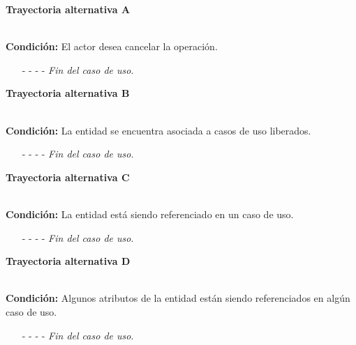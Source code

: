 \hypertarget{CU7-3:TAA}{\textbf{Trayectoria alternativa A}}\\
\noindent \textbf{Condición:} El actor desea cancelar la operación.
\begin{enumerate}
	\UCpaso[\UCactor] Oprime el botón  de la pantalla emergente.
	\UCpaso[\UCsist] Muestra la pantalla .
	\item[- -] - - {\em {Fin del caso de uso}}.%
\end{enumerate}		
\hypertarget{CU7-3:TAB}{\textbf{Trayectoria alternativa B}}\\
\noindent \textbf{Condición:} La entidad se encuentra asociada a casos de uso liberados.
\begin{enumerate}
	\UCpaso[\UCsist] Oculta el botón \eliminar de la entidad que esta asociada a casos de uso liberados.
	\item[- -] - - {\em {Fin del caso de uso}}.
\end{enumerate}
\hypertarget{CU7-3:TAC}{\textbf{Trayectoria alternativa C}}\\
\noindent \textbf{Condición:} La entidad está siendo referenciado en un caso de uso.
\begin{enumerate}
	\UCpaso[\UCsist] Muestra el mensaje  en la pantalla .
	\item[- -] - - {\em {Fin del caso de uso}}.
\end{enumerate}
\hypertarget{CU7-3:TAD}{\textbf{Trayectoria alternativa D}}\\
\noindent \textbf{Condición:} Algunos atributos de la entidad están siendo referenciados en algún caso de uso.
\begin{enumerate}
	\UCpaso[\UCsist] Muestra el mensaje  en la pantalla .
	\item[- -] - - {\em {Fin del caso de uso}}.
\end{enumerate}
	

